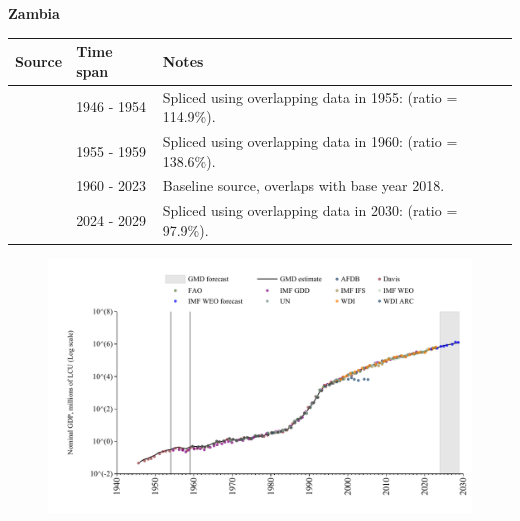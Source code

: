 \documentclass[12pt,a4paper,landscape]{article}
\begin{document}
\begin{adjustbox}{max totalsize={\paperwidth}{\paperheight},center}
\begin{minipage}[t][\textheight][t]{\textwidth}
\vspace*{0.5cm}
{}
\begin{center}
{\Large\bfseries Zambia}
\end{center}
\vspace{0.5cm}
\begin{table}[H]
\centering
\small
\begin{tabular}{|l|l|l|}
\hline
\textbf{Source} & \textbf{Time span} & \textbf{Notes} \\
\hline
\rowcolor{white}\cite{Davis}& 1946 - 1954 &Spliced using overlapping data in 1955: (ratio = 114.9\%).\\
\rowcolor{lightgray}\cite{IMF_GDD}& 1955 - 1959 &Spliced using overlapping data in 1960: (ratio = 138.6\%).\\
\rowcolor{white}\cite{WDI}& 1960 - 2023 &Baseline source, overlaps with base year 2018.\\
\rowcolor{lightgray}\cite{IMF_WEO_forecast}& 2024 - 2029 &Spliced using overlapping data in 2030: (ratio = 97.9\%).\\
\hline
\end{tabular}
\end{table}
\begin{figure}[H]
\centering
\includegraphics[width=\textwidth,height=0.6\textheight,keepaspectratio]{graphs/ZMB_nGDP.pdf}
\end{figure}
\end{minipage}
\end{adjustbox}
\end{document}
